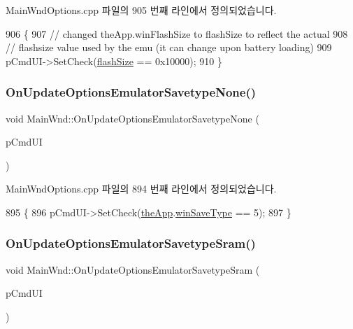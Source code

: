 Main\+Wnd\+Options.\+cpp 파일의 905 번째 라인에서 정의되었습니다.


\begin{DoxyCode}
906 \{
907   \textcolor{comment}{// changed theApp.winFlashSize to flashSize to reflect the actual}
908   \textcolor{comment}{// flashsize value used by the emu (it can change upon battery loading)}
909   pCmdUI->SetCheck(\mbox{\hyperlink{_flash_8cpp_a6cc360d6cd58f7c4ea981de97c808179}{flashSize}} == 0x10000);
910 \}
\end{DoxyCode}
\mbox{\label{class_main_wnd_acd01898bd8817e39f36dbd01d940dfc9}} 
\subsubsection{\texorpdfstring{On\+Update\+Options\+Emulator\+Savetype\+None()}{OnUpdateOptionsEmulatorSavetypeNone()}}
{\footnotesize\ttfamily void Main\+Wnd\+::\+On\+Update\+Options\+Emulator\+Savetype\+None (\begin{DoxyParamCaption}\item[{C\+Cmd\+UI $\ast$}]{p\+Cmd\+UI }\end{DoxyParamCaption})\hspace{0.3cm}{\ttfamily [protected]}}



Main\+Wnd\+Options.\+cpp 파일의 894 번째 라인에서 정의되었습니다.


\begin{DoxyCode}
895 \{
896   pCmdUI->SetCheck(\mbox{\hyperlink{_v_b_a_8cpp_a8095a9d06b37a7efe3723f3218ad8fb3}{theApp}}.\mbox{\hyperlink{class_v_b_a_a70060f88010280739406c87ef66d036a}{winSaveType}} == 5);
897 \}
\end{DoxyCode}
\mbox{\label{class_main_wnd_a8ad77ce8b5d29f009b9086f708ae2aba}} 
\subsubsection{\texorpdfstring{On\+Update\+Options\+Emulator\+Savetype\+Sram()}{OnUpdateOptionsEmulatorSavetypeSram()}}
{\footnotesize\ttfamily void Main\+Wnd\+::\+On\+Update\+Options\+Emulator\+Savetype\+Sram (\begin{DoxyParamCaption}\item[{C\+Cmd\+UI $\ast$}]{p\+Cmd\+UI }\end{DoxyParamCaption})\hspace{0.3cm}{\ttfamily [protected]}}



